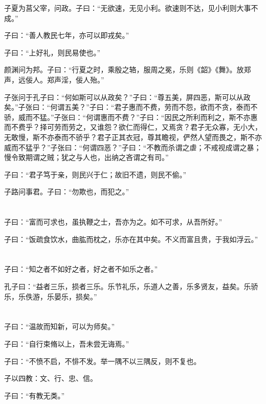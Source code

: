 \documentclass[a5paper]{ctexbook}
\begin{document}
    子夏为莒父宰，问政。子曰：“无欲速，无见小利。欲速则不达，见小利则大事不成。”

    子曰：“善人教民七年，亦可以即戎矣。”

    子曰：“上好礼，则民易使也。”

    颜渊问为邦。子曰：“行夏之时，乘殷之辂，服周之冕，乐则《韶》《舞》。放郑声，远佞人。郑声淫，佞人殆。”

    子张问于孔子曰：“何如斯可以从政矣？”子曰：“尊五美，屏四恶，斯可以从政矣。”子张曰：“何谓五美？”子曰：“君子惠而不费，劳而不怨，欲而不贪，泰而不骄，威而不猛。”子张曰：“何谓惠而不费？”子曰：“因民之所利而利之，斯不亦惠而不费乎？择可劳而劳之，又谁怨？欲仁而得仁，又焉贪？君子无众寡，无小大，无敢慢，斯不亦泰而不骄乎？君子正其衣冠，尊其瞻视，俨然人望而畏之，斯不亦威而不猛乎？”子张曰：“何谓四恶？”子曰：“不教而杀谓之虐；不戒视成谓之暴；慢令致期谓之贼；犹之与人也，出纳之吝谓之有司。”

    子曰：“君子笃于亲，则民兴于仁；故旧不遗，则民不偷。”

    子路问事君。子曰：“勿欺也，而犯之。”

    \chapter{}

    子曰：“富而可求也，虽执鞭之士，吾亦为之。如不可求，从吾所好。”

    子曰：“饭疏食饮水，曲肱而枕之，乐亦在其中矣。不义而富且贵，于我如浮云。”

    \chapter{}

    子曰：“知之者不如好之者，好之者不如乐之者。”

    孔子曰：“益者三乐，损者三乐。乐节礼乐，乐道人之善，乐多贤友，益矣。乐骄乐，乐佚游，乐晏乐，损矣。”

    \chapter{}

    子曰：“温故而知新，可以为师矣。”

    子曰：“自行束脩以上，吾未尝无诲焉。”

    子曰：“不愤不启，不悱不发。举一隅不以三隅反，则不复也。

    子以四教：文、行、忠、信。

    子曰：“有教无类。”
\end{document}
